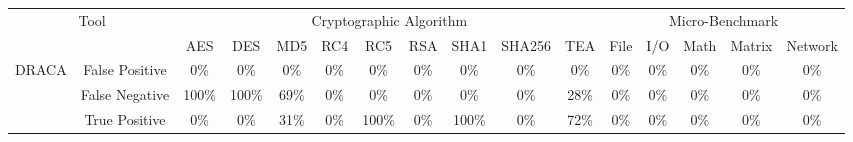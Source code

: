 \begin{table}[htb]
\centering
\setlength{\tabcolsep}{4pt} %
\renewcommand{\arraystretch}{1.2} %
\begin{adjustbox}{width=\textwidth}
\begin{tabular}{cc|ccccccccc|ccccc}
\hline
\multicolumn{2}{c||}{\multirow{2}{*}{Tool}} & \multicolumn{9}{c|}{Cryptographic Algorithm} & \multicolumn{5}{c}{Micro-Benchmark} \\ \cline{3-16} 
\multicolumn{2}{c||}{} & \multicolumn{1}{c|}{AES} & \multicolumn{1}{c|}{DES} & \multicolumn{1}{c|}{MD5} & \multicolumn{1}{c|}{RC4} & \multicolumn{1}{c|}{RC5} & \multicolumn{1}{c|}{RSA} & \multicolumn{1}{c|}{SHA1} & \multicolumn{1}{c|}{SHA256} & \multicolumn{1}{c|}{TEA} & \multicolumn{1}{c|}{File} & \multicolumn{1}{c|}{I/O} & \multicolumn{1}{c|}{Math} & \multicolumn{1}{c|}{Matrix} & Network\\ \hline\hline
\multicolumn{1}{c|}{\multirow{4}{*}{DRACA}} & \multicolumn{1}{c||}{False Positive} & \multicolumn{1}{c|}{0\%} & \multicolumn{1}{c|}{0\%} & \multicolumn{1}{c|}{0\%} & \multicolumn{1}{c|}{0\%} & \multicolumn{1}{c|}{0\%} & \multicolumn{1}{c|}{0\%} & \multicolumn{1}{c|}{0\%} & \multicolumn{1}{c|}{0\%} & \multicolumn{1}{c|}{0\%} & \multicolumn{1}{c|}{0\%} & \multicolumn{1}{c|}{0\%} & \multicolumn{1}{c|}{0\%} & \multicolumn{1}{c|}{0\%} & 0\% \\ \cline{2-16} 
\multicolumn{1}{c|}{} & \multicolumn{1}{c||}{False Negative} & \multicolumn{1}{c|}{100\%} & \multicolumn{1}{c|}{100\%} & \multicolumn{1}{c|}{69\%} & \multicolumn{1}{c|}{0\%} & \multicolumn{1}{c|}{0\%} & \multicolumn{1}{c|}{0\%} & \multicolumn{1}{c|}{0\%} & \multicolumn{1}{c|}{0\%} & \multicolumn{1}{c|}{28\%} & \multicolumn{1}{c|}{0\%} & \multicolumn{1}{c|}{0\%} & \multicolumn{1}{c|}{0\%} & \multicolumn{1}{c|}{0\%} & 0\% \\ \cline{2-16} 
\multicolumn{1}{c|}{} & \multicolumn{1}{c||}{True Positive} & \multicolumn{1}{c|}{0\%} & \multicolumn{1}{c|}{0\%} & \multicolumn{1}{c|}{31\%} & \multicolumn{1}{c|}{0\%} & \multicolumn{1}{c|}{100\%} & \multicolumn{1}{c|}{0\%} & \multicolumn{1}{c|}{100\%} & \multicolumn{1}{c|}{0\%} & \multicolumn{1}{c|}{72\%} & \multicolumn{1}{c|}{0\%} & \multicolumn{1}{c|}{0\%} & \multicolumn{1}{c|}{0\%} & \multicolumn{1}{c|}{0\%} & 0\% \\ \cline{2-16} 

\end{tabular}
\end{adjustbox}
\end{table}
